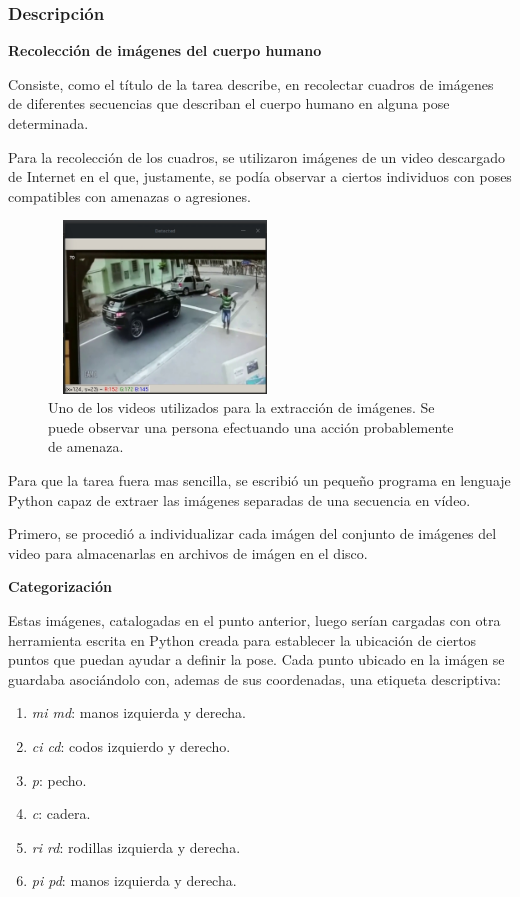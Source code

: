 \documentclass[a4paper,12pt,oneside,spanish]{book}
\begin{document}
\subsubsection{Descripción}


\textbf{Recolección de imágenes del cuerpo humano}\par

Consiste, como el título de la tarea describe, en recolectar cuadros de imágenes de diferentes secuencias que describan el cuerpo humano en alguna pose determinada.\par 

Para la recolección de los cuadros, se utilizaron imágenes de un video descargado de Internet en el que, justamente, se podía observar a ciertos individuos con poses compatibles con amenazas o agresiones.\par 

\begin{figure}[h!]
	\includegraphics[width=175pt,height=130pt]{Imagenes/video1.jpg}
	\centering
	\caption{Uno de los videos utilizados para la extracción de imágenes. Se puede observar una persona efectuando una acción probablemente de amenaza.}
	\label{fig:video1}
\end{figure}

Para que la tarea fuera mas sencilla, se escribió un pequeño programa en lenguaje Python capaz de extraer las imágenes separadas de una secuencia en vídeo.\par 

Primero, se procedió a individualizar cada imágen del conjunto de imágenes del video para almacenarlas en archivos de imágen en el disco.\par 

\textbf{Categorización}\par

Estas imágenes, catalogadas en el punto anterior, luego serían cargadas con otra herramienta escrita en Python creada para establecer la ubicación de ciertos puntos que puedan ayudar a definir la pose. Cada punto ubicado en la imágen se guardaba asociándolo con, ademas de sus coordenadas, una etiqueta descriptiva:
\begin{enumerate}\baselineskip 16pt	
	\item \textit{mi md}: manos izquierda y derecha.
	\item \textit{ci cd}: codos izquierdo y derecho.
	\item \textit{p}: pecho.
	\item \textit{c}: cadera.
	\item \textit{ri rd}: rodillas izquierda y derecha.
	\item \textit{pi pd}: manos izquierda y derecha.
\end{enumerate}	\baselineskip 16pt	
	
\end{document}
